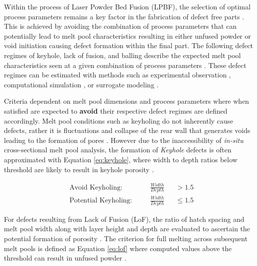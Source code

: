 Within the process of Laser Powder Bed Fusion (LPBF), the selection of optimal
process parameters remains a key factor in the fabrication of defect free parts
\cite{beuth_process_2013, gordon_defect_2020}. This is achieved by avoiding the
combination of process parameters that can potentially lead to melt pool
characteristics resulting in either unfused powder or void initiation causing
defect formation within the final part. The following defect regimes of keyhole,
lack of fusion, and balling describe the expected melt pool characteristics seen
at a given combination of process parameters \cite{gordon_defect_2020}. These
defect regimes can be estimated with methods such as experimental observation
\cite{ahmed_process_2022}, computational simulation
\cite{roh_ontology-based_2021}, or surrogate modeling
\cite{menon_multi-fidelity_2022}.

Criteria dependent on melt pool dimensions and process parameters where when
satisfied are expected to \textbf{avoid} their respective defect regimes are
defined accordingly. Melt pool conditions such as keyholing do not inherently
cause defects, rather it is fluctuations and collapse of the rear wall that
generates voids leading to the formation of pores \cite{huang_keyhole_2022}.
However due to the inaccessibility of \textit{in-situ} cross-sectional melt pool
analysis, the formation of \textit{Keyhole} defects is often approximated with
Equation \ref{eq:keyhole}, where width to depth ratios below threshold are
likely to result in keyhole porosity \cite{zhang_efficient_2021}.

\begin{subequations}
\label{eq:keyhole}
\begin{alignat}{2}
  &\text{Avoid Keyholing:}      \quad && \frac{Width}{Depth} &&> 1.5 \label{eq:avoid_keyholing}\\
  &\text{Potential Keyholing:}  \quad && \frac{Width}{Depth} &&\leq 1.5 \label{eq:potential_keyholing}
\end{alignat}
\end{subequations}

For defects resulting from Lack of Fusion (LoF), the ratio of hatch spacing and
melt pool width along with layer height and depth are evaluated to ascertain the
potential formation of porosity \cite{tang_prediction_2017}. The criterion for
full melting across subsequent melt pools is defined as Equation \ref{eq:lof}
where computed values above the threshold can result in unfused powder
\cite{tang_prediction_2017, miner_impact_2024}.

